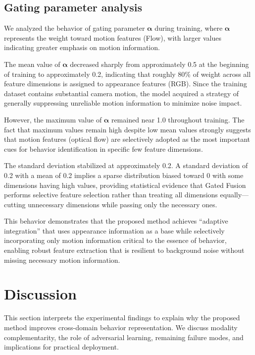 \documentclass[twocolumn]{svjour3}
\begin{document}
\subsection{Gating parameter analysis}

We analyzed the behavior of gating parameter $\boldsymbol{\alpha}$ during training, where $\boldsymbol{\alpha}$ represents the weight toward motion features (Flow), with larger values indicating greater emphasis on motion information.

The mean value of $\boldsymbol{\alpha}$ decreased sharply from approximately 0.5 at the beginning of training to approximately 0.2, indicating that roughly 80\% of weight across all feature dimensions is assigned to appearance features (RGB).
Since the training dataset contains substantial camera motion, the model acquired a strategy of generally suppressing unreliable motion information to minimize noise impact.

However, the maximum value of $\boldsymbol{\alpha}$ remained near 1.0 throughout training.
The fact that maximum values remain high despite low mean values strongly suggests that motion features (optical flow) are selectively adopted as the most important cues for behavior identification in specific few feature dimensions.

The standard deviation stabilized at approximately 0.2.
A standard deviation of 0.2 with a mean of 0.2 implies a sparse distribution biased toward 0 with some dimensions having high values, providing statistical evidence that Gated Fusion performs selective feature selection rather than treating all dimensions equally---cutting unnecessary dimensions while passing only the necessary ones.

This behavior demonstrates that the proposed method achieves ``adaptive integration'' that uses appearance information as a base while selectively incorporating only motion information critical to the essence of behavior, enabling robust feature extraction that is resilient to background noise without missing necessary motion information.

\section{Discussion}
\label{sec:discussion}

This section interprets the experimental findings to explain why the proposed method improves cross-domain behavior representation.
We discuss modality complementarity, the role of adversarial learning, remaining failure modes, and implications for practical deployment.
\end{document}
